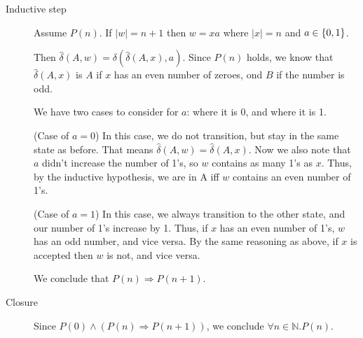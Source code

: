 \documentclass{article}
\begin{document}
\begin{enumerate}
\begin{description}
            \item[Inductive step]
                Assume $P(n)$. If $|w| = n + 1$ then $w = xa$ where $|x| = n$ and $a \in \set{0,1}$.

                Then $\hat{\delta}(A, w) = \delta(\hat{\delta}(A, x), a)$. Since $P(n)$ holds, we know that $\hat{\delta}(A,x)$ is $A$ if $x$ has an even number of zeroes, ond $B$ if the number is odd.

                We have two cases to consider for $a$: where it is 0, and where it is 1.

                (Case of $a=0$) In this case, we do not transition, but stay in the same state as before. That means $\hat{\delta}(A, w) = \hat{\delta}(A,x)$. Now we also note that $a$ didn't increase the number of 1's, so $w$ contains as many 1's as $x$. Thus, by the inductive hypothesis, we are in A iff $w$ contains an even number of 1's.

                (Case of $a=1$) In this case, we always transition to the other state, and our number of 1's increase by 1. Thus, if $x$ has an even number of 1's, $w$ has an odd number, and vice versa. By the same reasoning as above, if $x$ is accepted then $w$ is not, and vice versa.

                We conclude that $P(n) \Rightarrow P(n+1)$.
                
            \item[Closure]
                Since $P(0) \land (P(n) \Rightarrow P(n+1))$, we conclude $\forall n \in \mathbb{N}. P(n)$.

        \end{description}

\end{enumerate}
\end{document}
